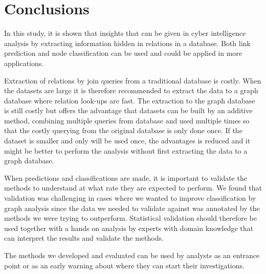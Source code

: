 \chapter{Conclusions}

In this study, it is shown that insights that can be given in cyber intelligence analysis by extracting information hidden in relations in a database. Both link prediction and node classification can be used and could be applied in more applications. 

Extraction of relations by join queries from a traditional database is costly. When the datasets are large it is therefore recommended to extract the data to a graph database where relation look-ups are fast. The extraction to the graph database is still costly but offers the advantage that datasets can be built by an additive method, combining multiple queries from database and used multiple times so that the costly querying from the original database is only done once. If the dataset is smaller and only will be used once, the advantages is reduced and it might be better to perform the analysis without first extracting the data to a graph database.

When predictions and classifications are made, it is important to validate the methods to understand at what rate they are expected to perform. We found that validation was challenging in cases where we wanted to improve classification by graph analysis since the data we needed to validate against was annotated by the methods we were trying to outperform. Statistical validation should therefore be used together with a hands on analysis by experts with domain knowledge that can interpret the results and validate the methods.

The methods we developed and evaluated can be used by analysts as an entrance point or as an early warning about where they can start their investigations.